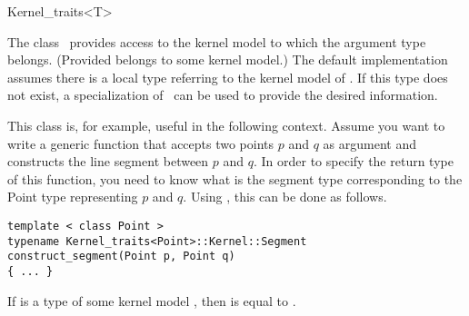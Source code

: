 \begin{ccRefClass}{Kernel_traits<T>}


\ccDefinition

The class \ccClassTemplateName\ provides access to the kernel model to
which the argument type  belongs. (Provided  belongs to
some kernel model.)  The default implementation assumes there is a
local type  referring to the kernel model of .
If this type does not exist, a specialization of \ccRefName\ can be
used to provide the desired information.

This class is, for example, useful in the following context. Assume
you want to write a generic function that accepts two points $p$ and
$q$ as argument and constructs the line segment between $p$ and $q$.
In order to specify the return type of this function, you need to know
what is the segment type corresponding to the Point type representing
$p$ and $q$. Using \ccRefName, this can be done as follows.
\begin{verbatim}
template < class Point >
typename Kernel_traits<Point>::Kernel::Segment
construct_segment(Point p, Point q)
{ ... } 
\end{verbatim}


\ccTypes

 { If  is a type
   of some kernel model , then  is
  equal to . }

\ccTexHtml{\KernelRefLayout}{}
\end{ccRefClass}

